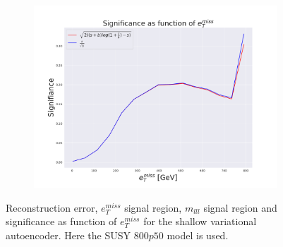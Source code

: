 \begin{figure}[H]
    \hfill  
    \begin{subfigure}{.60\textwidth}
        \includegraphics[width=\textwidth]{Figures/VAE_testing/small/2lep/significance_etmiss_800p0p050_-0.8542149600758421.pdf}
        \caption{}
        \label{ffig:VAE_2lep_small_signi_800}
    \end{subfigure}
    \hfill      
    \caption[2lep shallow network | $800p50$ | VAE]{Reconstruction error, $e_T^{miss}$ signal region, $m_{lll}$ signal region and significance as function of 
    $e_T^{miss}$ for the shallow variational autoencoder. Here the SUSY $800p50$ model is used.}
    \label{fig:VAE_2lep_small_rec_sig_signi_800}
\end{figure}


